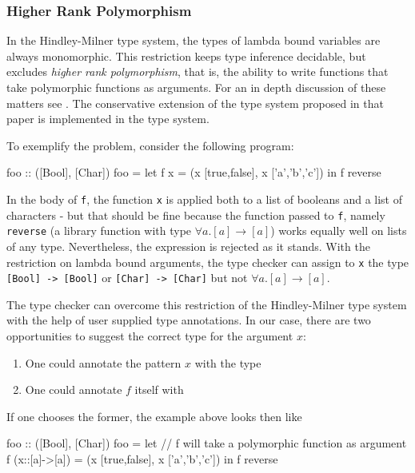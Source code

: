 \subsubsection{Higher Rank Polymorphism} \label{higher-rank}

In the Hindley-Milner type system, the types of lambda bound variables are always monomorphic. This restriction keeps type inference decidable, but excludes \emph{higher rank polymorphism}, that is, the ability to write functions that take polymorphic functions as arguments. For an in depth discussion of these matters see \cite{ptifart}. The conservative extension of the type system proposed in that paper is  implemented in the \frege{} type system.

To exemplify the problem, consider the following program:

\begin{code}
foo :: ([Bool], [Char])
foo = let
        f x = (x [true,false], x ['a','b','c'])
    in f reverse
\end{code}

In the body of \texttt{f}, the function \texttt{x} is applied both to a list of booleans and a list of characters - but that should be fine because the function passed to \texttt{f}, namely \texttt{reverse} (a library function with type $\forall{} a$.$[a] \rightarrow{} [a]$) works equally well on lists of any type. Nevertheless, the expression is rejected as it stands. With the restriction on lambda bound arguments, the type checker can assign to \texttt{x} the type \texttt{[Bool] -> [Bool]} or \texttt{[Char] -> [Char]} but not $\forall{} a$.$[a] \rightarrow{} [a]$.

The \frege{} type checker can overcome this restriction of the Hindley-Milner type system with the help of user supplied type annotations. In our case, there are two opportunities to suggest the correct type for the argument $x$:
\begin{enumerate}
\item One could annotate the pattern $x$ with the type 
\item One could annotate $f$ itself with 
\end{enumerate}

If one chooses the former, the example above looks then like

\begin{code}
foo :: ([Bool], [Char])
foo = let
        // f will take a polymorphic function as argument
        f (x::[a]->[a]) = (x [true,false], x ['a','b','c'])
    in f reverse
\end{code}

